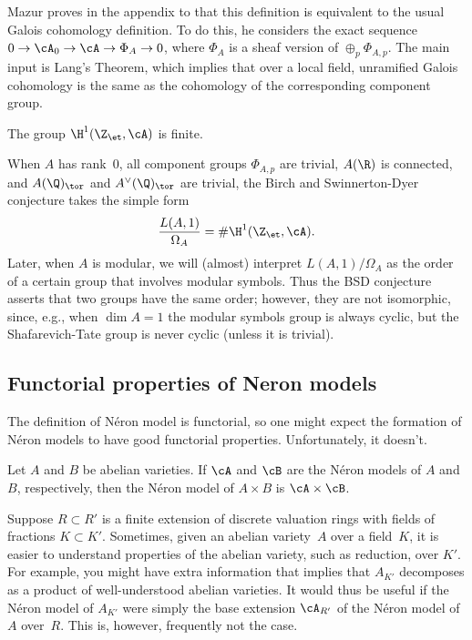 \documentclass{report}
\begin{document}
Mazur proves in the appendix to \cite{mazur:tower} that this
definition is equivalent to the usual Galois cohomology
definition.  To do this, he considers the exact sequence $0\to
\cA_0 \to \cA \to \Phi_A \to 0$, where $\Phi_A$ is a sheaf version
of $\oplus_{p} \Phi_{A,p}$. The main input is Lang's Theorem,
which implies that over a local field, unramified Galois
cohomology is the same as the cohomology of the corresponding
component group.

\begin{conjecture}
The group $\H^1(\Z_{\et},\cA)$ is finite.
\end{conjecture}

When $A$ has rank~$0$, all component groups $\Phi_{A,p}$ are
trivial, $A(\R)$ is connected, and $A(\Q)_{\tor}$ and
$A^{\vee}(\Q)_{\tor}$ are trivial, the Birch and Swinnerton-Dyer
conjecture takes the simple form
\[
  \frac{L(A,1)}{\Omega_A}  = \#\H^1(\Z_{\et},\cA).
\]
Later, when $A$ is modular, we will (almost)
interpret $L(A,1)/\Omega_A$ as the order of a certain group that
involves modular symbols.   Thus the BSD conjecture asserts that
two groups have the same order; however, they are not isomorphic,
since, e.g., when $\dim A=1$ the modular symbols group is always
cyclic, but the Shafarevich-Tate group is never cyclic (unless it
is trivial).


\subsection{Functorial properties of Neron models}
The definition of N\'eron model is functorial, so one might expect
the formation of N\'eron models to have good functorial
properties.  Unfortunately, it doesn't.

\begin{proposition}
Let $A$ and $B$ be abelian varieties.  If $\cA$ and $\cB$ are the
N\'eron models of $A$ and $B$, respectively, then the N\'eron
model of $A\times B$ is $\cA\times \cB$.
\end{proposition}

Suppose $R\subset R'$ is a finite extension of discrete valuation
rings with fields of fractions $K\subset K'$.  Sometimes, given an
abelian variety~$A$ over a field~$K$, it is easier to understand
properties of the abelian variety, such as reduction, over $K'$.
For example, you might have extra information that implies that
$A_{K'}$ decomposes as a product of well-understood abelian
varieties.  It would thus be useful if the N\'eron model of
$A_{K'}$ were simply the base extension $\cA_{R'}$ of the N\'eron
model of $A$ over~$R$. This is, however, frequently not the case.
\end{document}
